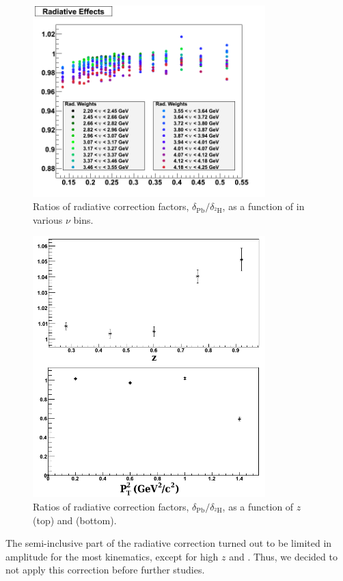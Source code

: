 \begin{figure}[htbp]
\centering
\includegraphics[width=9cm] {chap5-fig/ElecRadWei_Lead.png}
\caption {Ratios of radiative correction factors, $\delta_\text{Pb}/
\delta_{^2\text{H}}$, as a function of \xb in various $\nu$ bins.}
\label{fig:RadCorrFac}
\end{figure}

\begin{figure}[htbp]
\centering
\includegraphics[width=9cm] {chap5-fig/RadGenFactors.png}
\caption {Ratios of radiative correction factors, $\delta_\text{Pb}/
\delta_{^2\text{H}}$, as a function of $z$ (top) and \ptp (bottom).}
\label{fig:RadCorrFacSIDIS}
\end{figure}

The semi-inclusive part of the radiative correction turned out to be limited 
in amplitude for the most kinematics, except for high $z$ and \ptp. Thus, we decided to not apply this correction before further studies.

